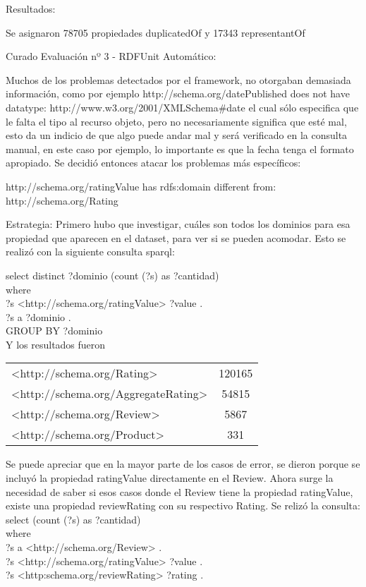 Resultados:

Se asignaron 78705 propiedades duplicatedOf y 17343 representantOf

Curado Evaluación nº 3 - RDFUnit Automático:

Muchos de los problemas detectados por el framework, no otorgaban demasiada información, como por ejemplo
http://schema.org/datePublished does not have datatype: http://www.w3.org/2001/XMLSchema\#date el cual sólo especifica que le 
falta el tipo al recurso objeto, pero no necesariamente significa que esté mal, esto da un indicio de que algo puede andar mal
y será verificado en la consulta manual, en este caso por ejemplo, lo importante es que la fecha tenga el formato apropiado.
Se decidió entonces atacar los problemas más específicos:

http://schema.org/ratingValue has rdfs:domain different from: http://schema.org/Rating

Estrategia:
Primero hubo que investigar, cuáles son todos los dominios para esa propiedad que aparecen en el dataset, para ver si se pueden 
acomodar. Esto se realizó con la siguiente consulta sparql:

select distinct ?dominio (count (?s) as ?cantidad) \\
where{\\
?s <http://schema.org/ratingValue> ?value .\\
?s a ?dominio .\\
}GROUP BY ?dominio\\

Y los resultados fueron

\begin{tabular}{| l | c |}
 <http://schema.org/Rating> & 120165\\
 <http://schema.org/AggregateRating> & 54815 \\
 <http://schema.org/Review> & 5867 \\
 <http://schema.org/Product> & 331 \\
\end{tabular}

Se puede apreciar que en la mayor parte de los casos de error, se dieron porque se incluyó la propiedad ratingValue directamente en 
el Review. Ahora surge la necesidad de saber si esos casos donde el Review tiene la propiedad ratingValue, existe una propiedad reviewRating 
con su respectivo Rating.
Se relizó la consulta:
select (count (?s) as ?cantidad) \\
where{\\
?s a <http://schema.org/Review> . \\
?s <http://schema.org/ratingValue> ?value . \\
?s <http:schema.org/reviewRating> ?rating . \\
}

